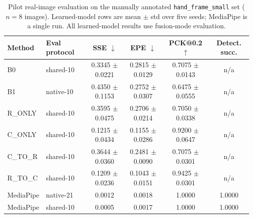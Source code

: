 \documentclass[10pt,letterpaper]{article}
\begin{document}
\begin{table}[H]
\centering
\footnotesize
\caption{Transfer-learning results for the four training sequences evaluated on both RHD and the COCO-style hand dataset. Values are mean $\pm$ std over five seeds, and fusion-mode evaluation is shown because it is the main operating mode in the study.}
\label{tab:transfer_learning}
\end{table}

\begin{table}[H]
\centering
\footnotesize
\caption{Pilot real-image evaluation on the manually annotated \texttt{hand\_frame\_small} set ($n=8$ images). Learned-model rows are mean $\pm$ std over five seeds; MediaPipe is a single run. All learned-model results use fusion-mode evaluation.}
\label{tab:hand_frame_small_pilot}
\begin{tabular}{llcccc}
\toprule
Method & Eval protocol & SSE $\downarrow$ & EPE $\downarrow$ & PCK@0.2 $\uparrow$ & Detect. succ. \\
\midrule
B0 & shared-10 & 0.3345 $\pm$ 0.0221 & 0.2815 $\pm$ 0.0129 & 0.7075 $\pm$ 0.0143 & n/a \\
B1 & native-10 & 0.4350 $\pm$ 0.1153 & 0.2752 $\pm$ 0.0307 & 0.6475 $\pm$ 0.0555 & n/a \\
R\_ONLY & shared-10 & 0.3595 $\pm$ 0.0475 & 0.2706 $\pm$ 0.0214 & 0.7050 $\pm$ 0.0338 & n/a \\
C\_ONLY & shared-10 & 0.1215 $\pm$ 0.0434 & 0.1155 $\pm$ 0.0286 & 0.9200 $\pm$ 0.0647 & n/a \\
C\_TO\_R & shared-10 & 0.3644 $\pm$ 0.0360 & 0.2481 $\pm$ 0.0090 & 0.7075 $\pm$ 0.0301 & n/a \\
R\_TO\_C & shared-10 & 0.1209 $\pm$ 0.0236 & 0.1043 $\pm$ 0.0151 & 0.9425 $\pm$ 0.0301 & n/a \\
MediaPipe & native-21 & 0.0012 & 0.0018 & 1.0000 & 1.0000 \\
MediaPipe & shared-10 & 0.0005 & 0.0017 & 1.0000 & 1.0000 \\
\bottomrule
\end{tabular}
\end{table}
\end{document}
